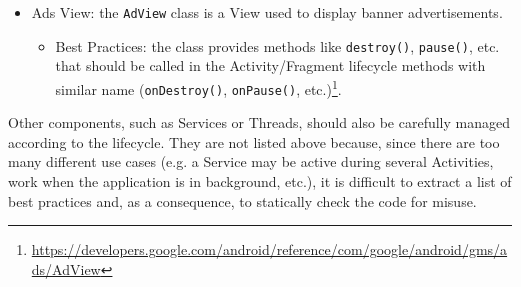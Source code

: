 \documentclass[11pt,a4paper,notitlepage]{article}
\begin{document}
\begin{itemize}
\begin{itemize}
\begin{itemize}
				\item Double Instantiation: methods to acquire the components like \texttt{setRepeatingRequest()}\footnote{\url{https://developer.android.com/reference/android/hardware/camera2/CameraCaptureSession.html\#setRepeatingRequest(android.hardware.camera2.CaptureRequest, android.hardware.camera2.CameraCaptureSession.CaptureCallback, android.os.Handler)}}, \texttt{createCaptureSession()}\footnote{\url{https://developer.android.com/reference/android/hardware/camera2/CameraDevice.html\#createCaptureSession(java.util.List\%3Candroid.view.Surface\%3E,\%20android.hardware.camera2.CameraCaptureSession.StateCallback,\%20android.os.Handler)}}, etc. replace the previous calls. For this reason, there's no need to check double instantiation for correctness, but since the time complexity of most of these calls is significant (e.g. \texttt{createCaptureSession()} "can take several hundred milliseconds") it can be checked for performance reasons.
			\end{itemize}
		\end{itemize}
	\item Ads View: the \texttt{AdView} class is a View used to display banner advertisements.
	\begin{itemize}
		\item Best Practices: the class provides methods like \texttt{destroy()}, \texttt{pause()}, etc. that should be called in the Activity/Fragment lifecycle methods with similar name (\texttt{onDestroy()}, \texttt{onPause()}, etc.)\footnote{\url{https://developers.google.com/android/reference/com/google/android/gms/ads/AdView}}.
	\end{itemize}
\end{itemize}

Other components, such as Services or Threads, should also be carefully managed according to the lifecycle. They are not listed above because, since there are too many different use cases (e.g. a Service may be active during several Activities, work when the application is in background, etc.), it is difficult to extract a list of best practices and, as a consequence, to statically check the code for misuse.
\end{document}
